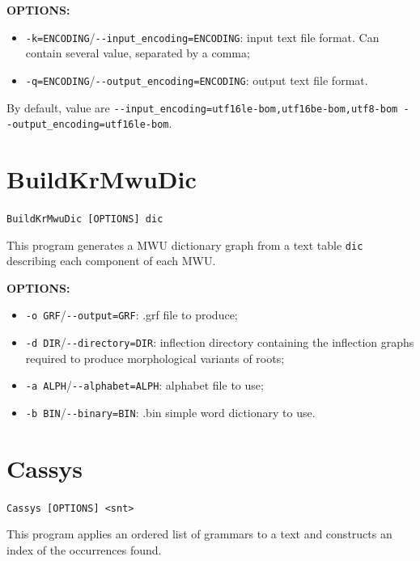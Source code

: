 \bigskip
\noindent \textbf{OPTIONS:}
\begin{itemize}
  \item \verb+-k=ENCODING+/\verb+--input_encoding=ENCODING+: input text file format. Can contain several value, separated by a comma;
  \item \verb+-q=ENCODING+/\verb+--output_encoding=ENCODING+: output text file format. 
\end{itemize}

By default, value are \verb+--input_encoding=utf16le-bom,utf16be-bom,utf8-bom --output_encoding=utf16le-bom+.


\section{BuildKrMwuDic}
\verb+BuildKrMwuDic [OPTIONS] dic+

\bigskip
\noindent This program generates a MWU dictionary graph from a text table \verb+dic+ describing each component
of each MWU.  

\bigskip
\noindent \textbf{OPTIONS:}
\begin{itemize}
   \item \verb+-o GRF+/\verb+--output=GRF+: .grf file to produce;
   \item \verb+-d DIR+/\verb+--directory=DIR+: inflection directory containing the inflection graphs required
   to produce morphological variants of roots;
   \item \verb+-a ALPH+/\verb+--alphabet=ALPH+: alphabet file to use;
   \item \verb+-b BIN+/\verb+--binary=BIN+: .bin simple word dictionary to use.
\end{itemize}

\section{Cassys}
\verb+Cassys [OPTIONS] <snt>+

\bigskip
\noindent This program applies an ordered list of grammars to a text and constructs an index of the occurrences found.


